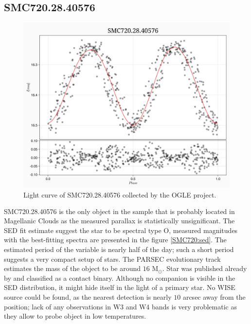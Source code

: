 \documentclass{pracalicmgr}
\begin{document}
\subsection{SMC720.28.40576}
\begin{figure}[H]
      \centering
      \includegraphics[scale=0.35]{plots/SMC720.28.40576_phase.png}
      \caption{Light curve of SMC720.28.40576 collected by the OGLE project.}
      \label{SMC720:lc}
\end{figure}
SMC720.28.40576 is the only object in the sample that is probably located in Magellanic Clouds as the measured parallax is statistically unsignificant.
The SED fit estimate suggest the star to be spectral type O, measured magnitudes with the best-fitting spectra are presented in the figure \ref{SMC720:sed}.
The estimated period of the variable is nearly half of the day; such a short period suggests a very compact setup of stars.
The PARSEC evolutionary track estimates the mass of the object to be around $16$  $\textrm{M}_{\odot}$.
Star was published already by \citep{pawlak_ogle_2016} and classified as a contact binary. Although
no companion is visible in the SED distribution, it might hide itself in the light of a primary star.
No WISE source could be found, as the nearest detection is nearly $10$ arcsec away from the position; lack of any observations
in W3 and W4 bands is very problematic as they allow to probe object in low temperatures.
\end{document}
